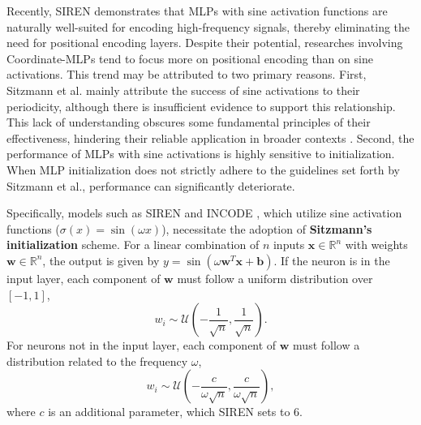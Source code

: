 \documentclass[letterpaper]{article} %
\begin{document}
Recently, SIREN \cite{sitzmann2020siren} demonstrates that MLPs with sine activation functions are naturally well-suited for encoding high-frequency signals, thereby eliminating the need for positional encoding layers. Despite their potential, researches involving Coordinate-MLPs tend to focus more on positional encoding than on sine activations. This trend may be attributed to two primary reasons. First, Sitzmann et al. mainly attribute the success of sine activations to their periodicity, although there is insufficient evidence to support this relationship. This lack of understanding obscures some fundamental principles of their effectiveness, hindering their reliable application in broader contexts \cite{ramasinghe2022activations}. Second, the performance of MLPs with sine activations is highly sensitive to initialization. When MLP initialization does not strictly adhere to the guidelines set forth by Sitzmann et al., performance can significantly deteriorate.

Specifically, models such as SIREN \cite{sitzmann2020siren} and INCODE \cite{kazerouni2023incode}, which utilize sine activation functions ($\sigma(x)=\sin(\omega x)$), necessitate the adoption of \textbf{Sitzmann's initialization} scheme. For a linear combination of $n$ inputs $\mathbf{x} \in \mathbb{R}^n$ with weights $\mathbf{w} \in \mathbb{R}^n$, the output is given by $y=\sin \left(\omega \mathbf{w}^T \mathbf{x}+\mathbf{b}\right)$. If the neuron is in the input layer, each component of $\mathbf{w}$ must follow a uniform distribution over $[-1,1]$, 
$$
w_i \sim \mathcal{U}(-\frac{1}{\sqrt{n}}, \frac{1}{\sqrt{n}}).
$$ For neurons not in the input layer, each component of $\mathbf{w}$ must follow a distribution related to the frequency $\omega$, 
$$
w_i \sim \mathcal{U}(-\frac{c}{\omega \sqrt{n}}, \frac{c}{\omega \sqrt{n}}),
$$ where \(c\) is an additional parameter, which SIREN sets to 6. 
\end{document}
